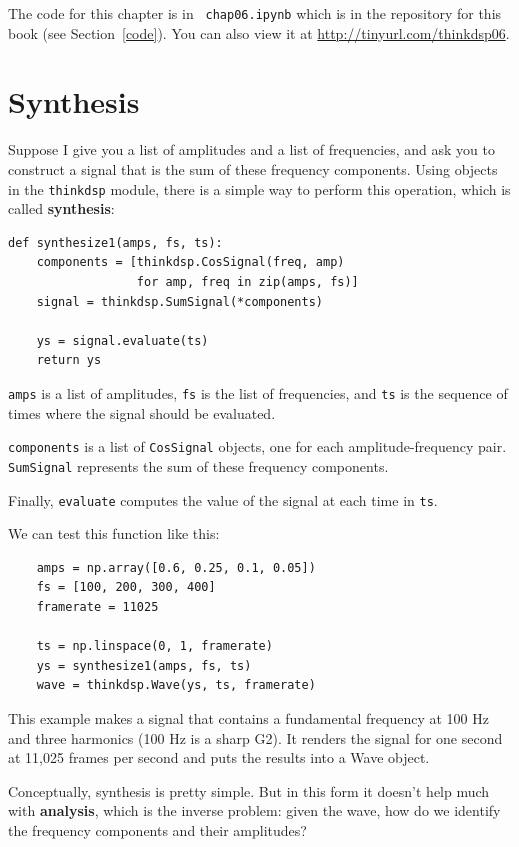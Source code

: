 \documentclass[12pt]{book}
\begin{document}
The code for this chapter is in {\tt
  chap06.ipynb} which is in the repository for this book (see
Section~\ref{code}).
You can also view it at \url{http://tinyurl.com/thinkdsp06}.


\section{Synthesis}
\label{synth1}

Suppose I give you a list of amplitudes and a list of frequencies,
and ask you to construct a signal that is the sum of these frequency
components.  Using objects in the {\tt thinkdsp} module, there is
a simple way to perform this operation, which is called {\bf synthesis}:

\begin{verbatim}
def synthesize1(amps, fs, ts):
    components = [thinkdsp.CosSignal(freq, amp)
                  for amp, freq in zip(amps, fs)]
    signal = thinkdsp.SumSignal(*components)

    ys = signal.evaluate(ts)
    return ys
\end{verbatim}

{\tt amps} is a list of amplitudes, {\tt fs} is the list
of frequencies, and {\tt ts} is the sequence
of times where the signal should be evaluated.

{\tt components} is a list of {\tt CosSignal} objects, one for
each amplitude-frequency pair.  {\tt SumSignal} represents the
sum of these frequency components.

Finally, {\tt evaluate} computes the value of the signal at each
time in {\tt ts}.

We can test this function like this:

\begin{verbatim}
    amps = np.array([0.6, 0.25, 0.1, 0.05])
    fs = [100, 200, 300, 400]
    framerate = 11025

    ts = np.linspace(0, 1, framerate)
    ys = synthesize1(amps, fs, ts)
    wave = thinkdsp.Wave(ys, ts, framerate)
\end{verbatim}

This example makes a signal that contains a fundamental frequency at
100 Hz and three harmonics (100 Hz is a sharp G2).  It renders the
signal for one second at 11,025 frames per second and puts the results
into a Wave object.

Conceptually, synthesis is pretty simple.  But in this form it doesn't
help much with {\bf analysis}, which is the inverse problem: given the
wave, how do we identify the frequency components and their amplitudes?
\end{document}
